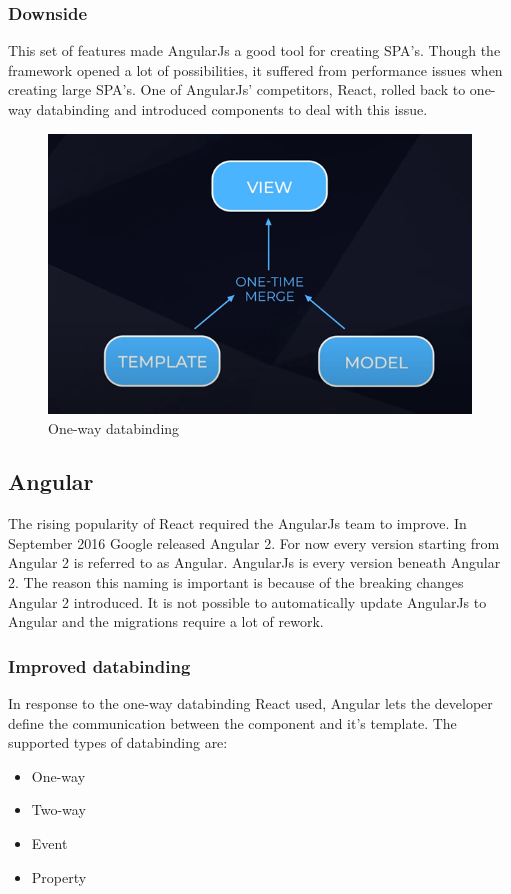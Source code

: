 \subsubsection{Downside}
This set of features made AngularJs a good tool for creating SPA's. Though the framework opened a lot of possibilities, it suffered from performance issues when creating large SPA's. One of AngularJs' competitors, React, rolled back to one-way databinding and introduced components to deal with this issue. \autocite{AltexSoft}
\begin{figure}[h!]
    \caption{One-way databinding}
    \centering
    \includegraphics[width=\textwidth]{img/onewaydata.png} 
\end{figure}

\subsection{Angular}
The rising popularity of React required the AngularJs team to improve. In September 2016 Google released Angular 2. For now every version starting from Angular 2 is referred to as Angular. AngularJs is every version beneath Angular 2. The reason this naming is important is because of the breaking changes Angular 2 introduced. It is not possible to automatically update AngularJs to Angular and the migrations require a lot of rework.
\autocite{Semenas2020}

\subsubsection{Improved databinding}
In response to the one-way databinding React used, Angular lets the developer define the communication between the component and it's template. The supported types of databinding are:
\begin{itemize}
    \item One-way
    \item Two-way
    \item Event
    \item Property
\end{itemize}
\autocite{AltexSoft}

